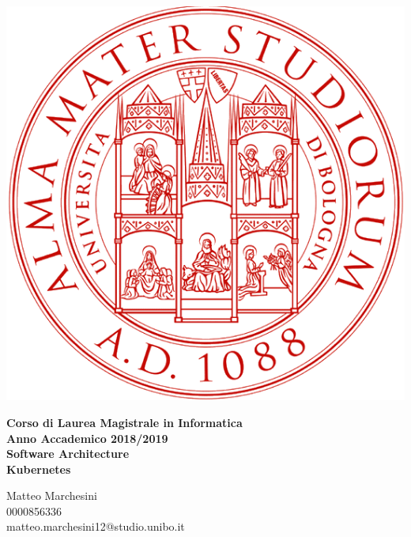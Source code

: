 \documentclass[12pt, a4paper]{report}
\begin{document}
\begin{titlepage}
\vspace{15mm}
\begin{center}
  \includegraphics{Images/uniboLogo}
\end{center}
\begin{center}
{\normalsize{\bf Corso di Laurea Magistrale in Informatica}}\\
\vspace{5mm}
{\normalsize{\bf Anno Accademico 2018/2019}}\\
\vspace{20mm}
{\Large{\bf Software Architecture}}\\
\vspace{10mm}
{\Huge{\bf Kubernetes}}\\
\vspace{25mm}
\end{center}
\begin{center}
{\large{Matteo Marchesini\\0000856336\\matteo.marchesini12@studio.unibo.it}}
\end{center}
\end{titlepage}
\tableofcontents
\end{document}
